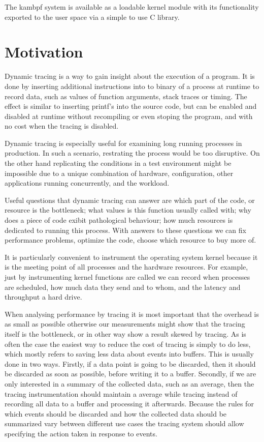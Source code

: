 \documentclass[12pt,twoside,notitlepage]{report}
\begin{document}
    The kambpf system is available as a loadable kernel module with its functionality exported to the user space via a simple to use C library.

    \section{Motivation}

        Dynamic tracing is a way to gain insight about the execution of a program. It is done by inserting additional instructions into to binary of a process at runtime to record data, such as values of function arguments, stack traces or timing. The effect is similar to inserting printf's into the source code, but can be enabled and disabled at runtime without recompiling or even stoping the program, and with no cost when the tracing is disabled.

        Dynamic tracing is especially useful for examining long running processes in production. In such a scenario, restrating the process would be too disruptive. On the other hand replicating the conditions in a test environment might be impossible due to a unique combination of hardware, configuration, other applications running concurrently, and the workload. 

        Useful questions that dynamic tracing can answer are which part of the code, or resource is the bottleneck; what values is this function usually called with; why does a piece of code exibit pathological behaviour; how much resources is dedicated to running this process. With answers to these questions we can fix performance problems, optimize the code, choose which resource to buy more of.

        It is particularly convenient to instrument the operating system kernel because it is the meeting point of all processes and the hardware resources. For example, just by instrumenting kernel functions are called we can record when processes are scheduled, how much data they send and to whom, and the latency and throughput a hard drive.

        When analysing performance by tracing it is most important that the overhead is as small as possible otherwise our measurements might show that the tracing itself is the bottleneck, or in other way show a result skewed by tracing. As is often the case the easiest way to reduce the cost of tracing is simply to do less, which mostly refers to saving less data about events into buffers. This is usually done in two ways. Firstly, if a data point is going to be discarded, then it should be discarded as soon as possible, before writing it to a buffer. Secondly, if we are only interested in a summary of the collected data, such as an average, then the tracing instrumentation should maintain a average while tracing instead of recording all data to a buffer and processing it afterwards. Because the rules for which events should be discarded and how the collected data should be summarized vary between different use cases the tracing system should allow specifying the action taken in response to events.
\end{document}
